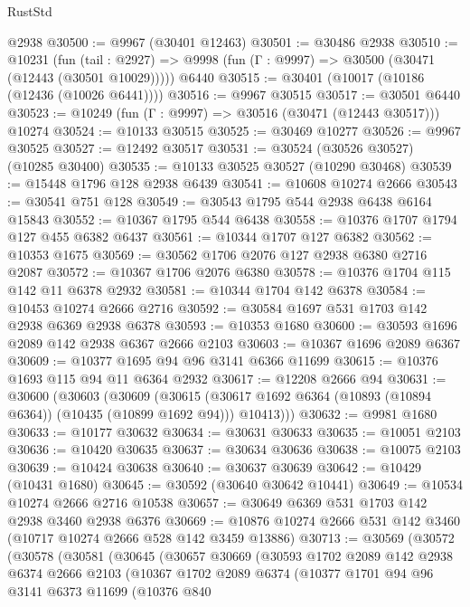 \begin{lexlean}{RustStd}
\begin{coremodule}
    @2938
@30500 := @9967 (@30401 @12463)
@30501 := @30486 @2938
@30510 := @10231
    (fun (tail : @2927) => @9998 (fun (Γ : @9997) => @30500 (@30471 (@12443 (@30501 @10029)))))
    @6440
@30515 := @30401 (@10017 (@10186 (@12436 (@10026 @6441))))
@30516 := @9967 @30515
@30517 := @30501 @6440
@30523 := @10249 (fun (Γ : @9997) => @30516 (@30471 (@12443 @30517))) @10274
@30524 := @10133 @30515
@30525 := @30469 @10277
@30526 := @9967 @30525
@30527 := @12492 @30517
@30531 := @30524 (@30526 @30527) (@10285 @30400)
@30535 := @10133 @30525 @30527 (@10290 @30468)
@30539 := @15448 @1796 @128 @2938 @6439
@30541 := @10608 @10274 @2666
@30543 := @30541 @751 @128
@30549 := @30543 @1795 @544 @2938 @6438 @6164 @15843
@30552 := @10367 @1795 @544 @6438
@30558 := @10376 @1707 @1794 @127 @455 @6382 @6437
@30561 := @10344 @1707 @127 @6382
@30562 := @10353 @1675
@30569 := @30562 @1706 @2076 @127 @2938 @6380 @2716 @2087
@30572 := @10367 @1706 @2076 @6380
@30578 := @10376 @1704 @115 @142 @11 @6378 @2932
@30581 := @10344 @1704 @142 @6378
@30584 := @10453 @10274 @2666 @2716
@30592 := @30584 @1697 @531 @1703 @142 @2938 @6369 @2938 @6378
@30593 := @10353 @1680
@30600 := @30593 @1696 @2089 @142 @2938 @6367 @2666 @2103
@30603 := @10367 @1696 @2089 @6367
@30609 := @10377 @1695 @94 @96 @3141 @6366 @11699
@30615 := @10376 @1693 @115 @94 @11 @6364 @2932
@30617 := @12208 @2666 @94
@30631 := @30600
    (@30603
      (@30609
        (@30615 (@30617 @1692 @6364 (@10893 (@10894 @6364)) (@10435 (@10899 @1692 @94))) @10413)))
@30632 := @9981 @1680
@30633 := @10177 @30632
@30634 := @30631 @30633
@30635 := @10051 @2103
@30636 := @10420 @30635
@30637 := @30634 @30636
@30638 := @10075 @2103
@30639 := @10424 @30638
@30640 := @30637 @30639
@30642 := @10429 (@10431 @1680)
@30645 := @30592 (@30640 @30642 @10441)
@30649 := @10534 @10274 @2666 @2716 @10538
@30657 := @30649 @6369 @531 @1703 @142 @2938 @3460 @2938 @6376
@30669 := @10876 @10274 @2666 @531 @142 @3460 (@10717 @10274 @2666 @528 @142 @3459 @13886)
@30713 := @30569
    (@30572
      (@30578
        (@30581
          (@30645
            (@30657
              @30669
              (@30593
                @1702
                @2089
                @142
                @2938
                @6374
                @2666
                @2103
                (@10367
                  @1702
                  @2089
                  @6374
                  (@10377
                    @1701
                    @94
                    @96
                    @3141
                    @6373
                    @11699
                    (@10376
                      @840

\end{coremodule}
\end{lexlean}
